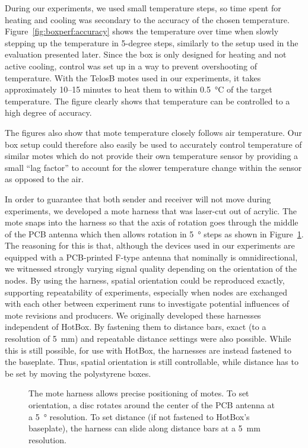 \documentclass[color]{aib}
\begin{document}
During our experiments, we used small temperature steps, so time spent for heating and cooling was secondary to the accuracy of the chosen temperature.
Figure~\ref{fig:boxperf:accuracy} shows the temperature over time when slowly stepping up the temperature in 5-degree steps, similarly to the setup used in the evaluation presented later.
Since the box is only designed for heating and not active cooling, control was set up in a way to prevent overshooting of temperature.
With the TelosB motes used in our experiments, it takes approximately 10--15 minutes to heat them to within \SI{0.5}{\celsius} of the target temperature.
The figure clearly shows that temperature can be controlled to a high degree of accuracy.

The figures also show that mote temperature closely follows air temperature.
Our box setup could therefore also easily be used to accurately control temperature of similar motes which do not provide their own temperature sensor by providing a small ``lag factor'' to account for the slower temperature change within the sensor as opposed to the air.

In order to guarantee that both sender and receiver will not move during experiments, we developed a mote harness that was laser-cut out of acrylic.
The mote snaps into the harness so that the axis of rotation goes through the middle of the PCB antenna which then allows rotation in \SI{5}{\degree} steps as shown in Figure~\ref{fig:mote_harness}.
The reasoning for this is that, although the devices used in our experiments are equipped with a PCB-printed F-type antenna that nominally is omnidirectional, we witnessed strongly varying signal quality depending on the orientation of the nodes.
By using the harness, spatial orientation could be reproduced exactly, supporting repeatability of experiments, especially when nodes are exchanged with each other between experiment runs to investigate potential influences of mote revisions and producers.
We originally developed these harnesses independent of HotBox.
By fastening them to distance bars, exact (to a resolution of \SI{5}{\milli\metre}) and repeatable distance settings were also possible.
While this is still possible, for use with HotBox, the harnesses are instead fastened to the baseplate.
Thus, spatial orientation is still controllable, while distance has to be set by moving the polystyrene boxes.

\begin{figure}[t]
\centering
	\caption{The mote harness allows precise positioning of motes. To set orientation, a disc rotates around the center of the PCB antenna at a \SI{5}{\degree} resolution. To set distance (if not fastened to HotBox's baseplate), the harness can slide along distance bars at a \SI{5}{\milli\metre} resolution.}
	\label{fig:mote_harness}
\end{figure}
\end{document}
